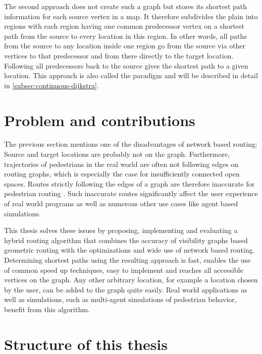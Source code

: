 	The second approach does not create such a graph but stores its shortest path information for each source vertex in a map.
	It therefore subdivides the plain into regions with each region having one common predecessor vertex on a shortest path from the source to every location in this region.
	In other words, all paths from the source to any location inside one region go from the source via other vertices to that predecessor and from there directly to the target location.
	Following all predecessors back to the source gives the shortest path to a given location.
	This approach is also called the  paradigm and will be described in detail in \cref{subsec:continuous-dijkstra}.
	
\section{Problem and contributions}

	The previous section mentions one of the disadvantages of network based routing:
	Source and target locations are probably not on the graph.
	Furthermore, trajectories of pedestrians in the real world are often not following edges on routing graphs, which is especially the case for insufficiently connected open spaces.
	Routes strictly following the edges of a graph are therefore inaccurate for pedestrian routing \cite{graser-osm-open-spaces}.
	Such inaccurate routes significantly affect the user experience of real world programs as well as numerous other use cases like agent based simulations.

	This thesis solves these issues by proposing, implementing and evaluating a hybrid routing algorithm that combines the accuracy of visibility graphs based geometric routing with the optimizations and wide use of network based routing.
	Determining shortest paths using the resulting approach is fast, enables the use of common speed up techniques, easy to implement and reaches all accessible vertices on the graph.
	Any other arbitrary location, for example a location chosen by the user, can be added to the graph quite easily.
	Real world applications as well as simulations, such as multi-agent simulations of pedestrian behavior, benefit from this algorithm.
	
\section{Structure of this thesis}

